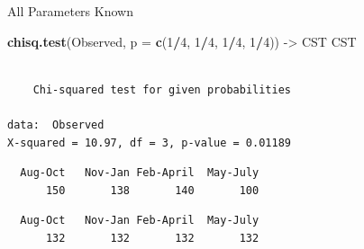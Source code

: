 \documentclass[
  ignorenonframetext,
]{beamer}
\newenvironment{Shaded}{\begin{snugshade}}{\end{snugshade}}
\newcommand{\AttributeTok}[1]{\textcolor[rgb]{0.13,0.29,0.53}{#1}}
\newcommand{\DecValTok}[1]{\textcolor[rgb]{0.00,0.00,0.81}{#1}}
\newcommand{\FunctionTok}[1]{\textcolor[rgb]{0.13,0.29,0.53}{\textbf{#1}}}
\newcommand{\NormalTok}[1]{#1}
\newcommand{\OtherTok}[1]{\textcolor[rgb]{0.56,0.35,0.01}{#1}}
\newcommand{\SpecialCharTok}[1]{\textcolor[rgb]{0.81,0.36,0.00}{\textbf{#1}}}
\begin{document}
\begin{frame}[fragile]{All Parameters Known}
\protect\hypertarget{all-parameters-known-3}{}
\begin{Shaded}
\begin{Highlighting}[]
\FunctionTok{chisq.test}\NormalTok{(Observed, }\AttributeTok{p =} \FunctionTok{c}\NormalTok{(}\DecValTok{1}\SpecialCharTok{/}\DecValTok{4}\NormalTok{, }\DecValTok{1}\SpecialCharTok{/}\DecValTok{4}\NormalTok{, }\DecValTok{1}\SpecialCharTok{/}\DecValTok{4}\NormalTok{, }\DecValTok{1}\SpecialCharTok{/}\DecValTok{4}\NormalTok{)) }\OtherTok{{-}\textgreater{}}\NormalTok{ CST}
\NormalTok{CST}
\end{Highlighting}
\end{Shaded}

\begin{verbatim}

    Chi-squared test for given probabilities

data:  Observed
X-squared = 10.97, df = 3, p-value = 0.01189
\end{verbatim}

\begin{Shaded}
\end{Shaded}

\begin{verbatim}
  Aug-Oct   Nov-Jan Feb-April  May-July 
      150       138       140       100 
\end{verbatim}

\begin{Shaded}
\end{Shaded}

\begin{verbatim}
  Aug-Oct   Nov-Jan Feb-April  May-July 
      132       132       132       132 
\end{verbatim}
\end{frame}
\end{document}
